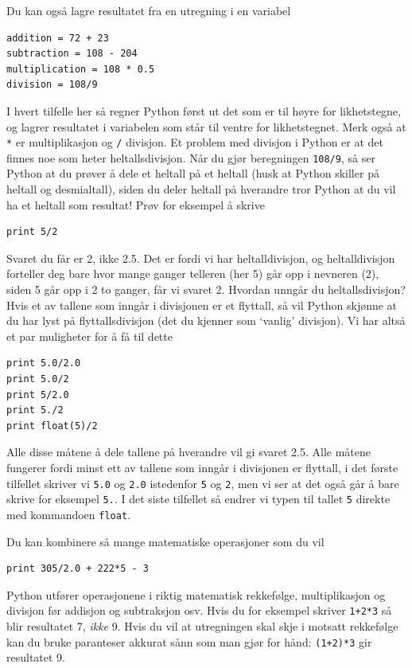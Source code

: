 \documentclass[a4paper, 11pt, notitlepage]{article}
\begin{document}
Du kan også lagre resultatet fra en utregning i en variabel
\begin{lstlisting}
addition = 72 + 23
subtraction = 108 - 204
multiplication = 108 * 0.5
division = 108/9
\end{lstlisting}
I hvert tilfelle her så regner Python først ut det som er til høyre for likhetstegne, og lagrer resultatet i variabelen som står til ventre for likhetstegnet. Merk også at \verb+*+ er multiplikasjon og \verb+/+ divisjon. Et problem med divisjon i Python er at det finnes noe som heter heltallsdivisjon. Når du gjør beregningen \verb+108/9+, så ser Python at du prøver å dele et heltall på et heltall (husk at Python skiller på heltall og desmialtall), siden du deler heltall på hverandre tror Python at du vil ha et heltall som resultat! Prøv for eksempel å skrive
\begin{lstlisting}
print 5/2
\end{lstlisting}
Svaret du får er 2, ikke 2.5. Det er fordi vi har heltalldivisjon, og heltalldivisjon forteller deg bare hvor mange ganger telleren (her 5) går opp i nevneren (2), siden 5 går opp i 2 to ganger, får vi svaret 2. Hvordan unngår du heltallsdivisjon? Hvis et av tallene som inngår i divisjonen er et flyttall, så vil Python skjønne at du har lyst på flyttallsdivisjon (det du kjenner som `vanlig' divisjon). Vi har altså et par muligheter for å få til dette
\begin{lstlisting}
print 5.0/2.0
print 5.0/2
print 5/2.0
print 5./2
print float(5)/2
\end{lstlisting}
Alle disse måtene å dele tallene på hverandre vil gi svaret 2.5. Alle måtene fungerer fordi minst ett av tallene som inngår i divisjonen er flyttall, i det første tilfellet skriver vi \verb+5.0+ og \verb+2.0+ istedenfor \verb+5+ og \verb+2+, men vi ser at det også går å bare skrive for eksempel \verb+5.+. I det siste tilfellet så endrer vi typen til tallet \verb+5+ direkte med kommandoen \verb+float+. 

Du kan kombinere så mange matematiske operasjoner som du vil
\begin{lstlisting}
print 305/2.0 + 222*5 - 3
\end{lstlisting}
Python utfører operasjonene i riktig matematisk rekkefølge, multiplikasjon og divisjon før addisjon og subtraksjon osv. Hvis du for eksempel skriver 
\verb!1+2*3! så blir resultatet 7, \emph{ikke} 9. Hvis du vil at utregningen skal skje i motsatt rekkefølge kan du bruke paranteser akkurat sånn som man gjør for hånd: \verb!(1+2)*3! gir resultatet 9.
\end{document}
